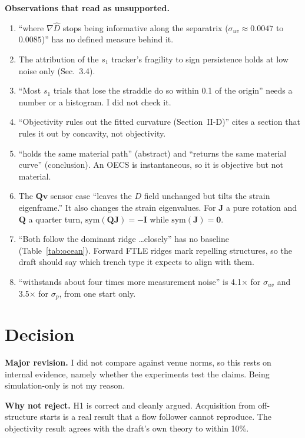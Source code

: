 \documentclass[10.5pt]{article}
\begin{document}
\textbf{Observations that read as unsupported.}
\begin{enumerate}[leftmargin=1.4em]
\item ``where $\nabla\hat D$ stops being informative along the separatrix ($\sigma_{uv}\approx0.0047$ to $0.0085$)'' has no defined measure behind it.
\item The attribution of the $s_1$ tracker's fragility to sign persistence holds at low noise only (Sec.~3.4).
\item ``Most $s_1$ trials that lose the straddle do so within 0.1 of the origin'' needs a number or a histogram. I did not check it.
\item ``Objectivity rules out the fitted curvature (Section~II-D)'' cites a section that rules it out by concavity, not objectivity.
\item ``holds the same material path'' (abstract) and ``returns the same material curve'' (conclusion). An OECS is instantaneous, so it is objective but not material.
\item The $\mathbf Q\mathbf v$ sensor case ``leaves the $D$ field unchanged but tilts the strain eigenframe.'' It also changes the strain eigenvalues. For $\mathbf J$ a pure rotation and $\mathbf Q$ a quarter turn, $\mathrm{sym}(\mathbf Q\mathbf J)=-\mathbf I$ while $\mathrm{sym}(\mathbf J)=\mathbf 0$.
\item ``Both follow the dominant ridge \ldots closely'' has no baseline (Table~\ref{tab:ocean}). Forward FTLE ridges mark repelling structures, so the draft should say which trench type it expects to align with them.
\item ``withstands about four times more measurement noise'' is 4.1$\times$ for $\sigma_{uv}$ and 3.5$\times$ for $\sigma_p$, from one start only.
\end{enumerate}

\section{Decision}

\textbf{Major revision.} I did not compare against venue norms, so this rests on internal evidence, namely whether the experiments test the claims. Being simulation-only is not my reason.

\textbf{Why not reject.} H1 is correct and cleanly argued. Acquisition from off-structure starts is a real result that a flow follower cannot reproduce. The objectivity result agrees with the draft's own theory to within 10\%.
\end{document}

